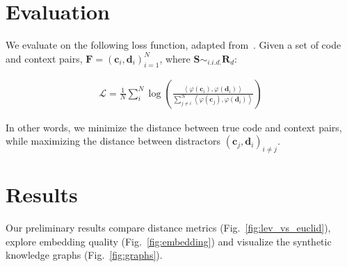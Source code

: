 \documentclass[sigconf]{acmart}
\begin{document}
  \pagebreak
  \section{Evaluation}\label{sec:evaluation}

  We evaluate on the following loss function, adapted from~\citep{husain2019codesearchnet}. Given a set of code and context pairs, $\mathbf{F} = (\mathbf{c}_i, \mathbf{d}_i)_{i = 1}^N$, where $\mathbf S \sim_{i.i.d.} \mathbf R_{d}$:

  \begin{align}
    \mathcal{L} = \frac{1}{N}\sum_i^N \log\left(\frac{\left<\varphi(\mathbf{c}_i), \varphi(\mathbf{d}_i)\right>}{\sum_{j \neq i}^N \left<\varphi(\mathbf{c}_j), \varphi(\mathbf{d}_i)\right>}\right)
  \end{align}

  In other words, we minimize the distance between true code and context pairs, while maximizing the distance between distractors $(\mathbf c_j, \mathbf d_i)_{i \neq j}$.

%
%

  \pagebreak
  \section{Results}\label{sec:results}

  Our preliminary results compare distance metrics (Fig.~\ref{fig:lev_vs_euclid}), explore embedding quality (Fig.~\ref{fig:embedding}) and visualize the synthetic knowledge graphs (Fig.~\ref{fig:graphs}).
\end{document}
